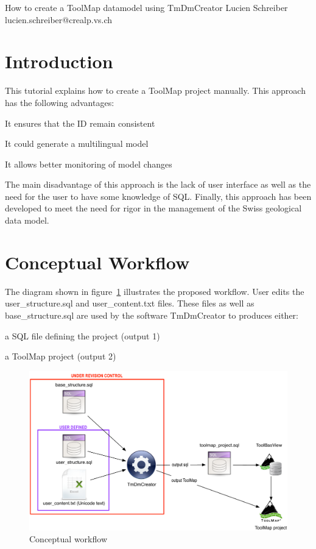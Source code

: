 \documentclass[a4paper, 12pt]{article}
\begin{document}
 {How to create a ToolMap datamodel using TmDmCreator} {Lucien Schreiber} {lucien.schreiber@crealp.vs.ch}
\tableofcontents
\pagebreak

\section{Introduction}
This tutorial explains how to create a ToolMap project manually. This approach has the following advantages:
\begin{enumerate*}
  \item It ensures that the ID remain consistent
  \item It could generate a multilingual model
  \item It allows better monitoring of model changes
\end{enumerate*}
The main disadvantage of this approach is the lack of user interface as well as the need for the user to have some knowledge of SQL. Finally, this approach has been developed to meet the need for rigor in the management of the Swiss geological data model.


\section{Conceptual Workflow}
The diagram shown in figure~\ref{fig:conceptual-workflow} illustrates the proposed workflow. User edits the user\_structure.sql and user\_content.txt files. These files as well as base\_structure.sql are used by the software TmDmCreator to produces either:
\begin{enumerate*}
  \item	a SQL file defining the project (output 1)
  \item	a ToolMap project (output 2)
\end{enumerate*}

\begin{figure} [htbp]
  \centering
  \includegraphics[width=1\textwidth]{img/workflow.pdf}
  \caption{Conceptual workflow}
  \label{fig:conceptual-workflow}
\end{figure}
\end{document}

